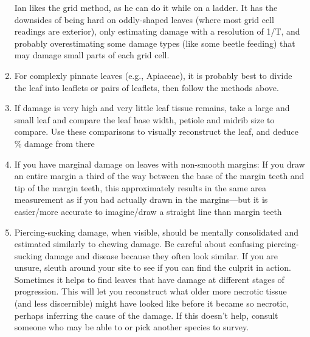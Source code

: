 \documentclass[
  letterpaper,
  DIV=11,
  numbers=noendperiod]{scrreprt}
\begin{document}
\begin{enumerate}
  Ian likes the grid method, as he can do it while on a ladder. It has
  the downsides of being hard on oddly-shaped leaves (where most grid
  cell readings are exterior), only estimating damage with a resolution
  of 1/T, and probably overestimating some damage types (like some
  beetle feeding) that may damage small parts of each grid cell.
\item
  For complexly pinnate leaves (e.g., Apiaceae), it is probably best to
  divide the leaf into leaflets or pairs of leaflets, then follow the
  methods above.
\item
  If damage is very high and very little leaf tissue remains, take a
  large and small leaf and compare the leaf base width, petiole and
  midrib size to compare. Use these comparisons to visually reconstruct
  the leaf, and deduce \% damage from there
\item
  If you have marginal damage on leaves with non-smooth margins: If you
  draw an entire margin a third of the way between the base of the
  margin teeth and tip of the margin teeth, this approximately results
  in the same area measurement as if you had actually drawn in the
  margins---but it is easier/more accurate to imagine/draw a straight
  line than margin teeth
\item
  Piercing-sucking damage, when visible, should be mentally consolidated
  and estimated similarly to chewing damage. Be careful about confusing
  piercing-sucking damage and disease because they often look similar.
  If you are unsure, sleuth around your site to see if you can find the
  culprit in action. Sometimes it helps to find leaves that have damage
  at different stages of progression. This will let you reconstruct what
  older more necrotic tissue (and less discernible) might have looked
  like before it became so necrotic, perhaps inferring the cause of the
  damage. If this doesn't help, consult someone who may be able to or
  pick another species to survey.
\end{enumerate}
\end{document}
